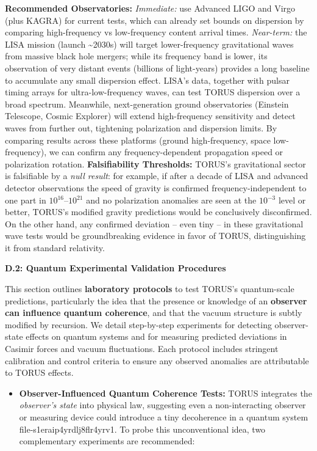 \documentclass[]{article}
\newcommand{\superscript}[1]{\ensuremath{^{\mathrm{#1}}}}
\begin{document}
\textbf{Recommended Observatories:} \emph{Immediate:} use Advanced LIGO
and Virgo (plus KAGRA) for current tests, which can already set bounds
on dispersion by comparing high-frequency vs low-frequency content
arrival times​. \emph{Near-term:} the LISA mission (launch
\textasciitilde{}2030s) will target lower-frequency gravitational waves
from massive black hole mergers; while its frequency band is lower, its
observation of very distant events (billions of light-years) provides a
long baseline to accumulate any small dispersion effect​. LISA's data,
together with pulsar timing arrays for ultra-low-frequency waves, can
test TORUS dispersion over a broad spectrum. Meanwhile, next-generation
ground observatories (Einstein Telescope, Cosmic Explorer) will extend
high-frequency sensitivity and detect waves from further out, tightening
polarization and dispersion limits. By comparing results across these
platforms (ground high-frequency, space low-frequency), we can confirm
any frequency-dependent propagation speed or polarization rotation.
\textbf{Falsifiability Thresholds:} TORUS's gravitational sector is
falsifiable by a \emph{null result}: for example, if after a decade of
LISA and advanced detector observations the speed of gravity is
confirmed frequency-independent to one part in
$10\superscript{16}$--$10\superscript{21}$
and no polarization anomalies are seen at the $10\superscript{−3}$ level or
better, TORUS's modified gravity predictions would be conclusively
disconfirmed​. On the other hand, any confirmed deviation -- even tiny
-- in these gravitational wave tests would be groundbreaking evidence in
favor of TORUS, distinguishing it from standard relativity.

\textbf{D.2: Quantum Experimental Validation Procedures}

This section outlines \textbf{laboratory protocols} to test TORUS's
quantum-scale predictions, particularly the idea that the presence or
knowledge of an \textbf{observer can influence quantum coherence}, and
that the vacuum structure is subtly modified by recursion. We detail
step-by-step experiments for detecting observer-state effects on quantum
systems and for measuring predicted deviations in Casimir forces and
vacuum fluctuations. Each protocol includes stringent calibration and
control criteria to ensure any observed anomalies are attributable to
TORUS effects.

\begin{itemize}
\item
  \textbf{Observer-Influenced Quantum Coherence Tests:} TORUS integrates
  the \emph{observer's state} into physical law, suggesting even a
  non-interacting observer or measuring device could introduce a tiny
  decoherence in a quantum system​file-s1eraip4yrdlj8flr4yrv1. To probe
  this unconventional idea, two complementary experiments are
  recommended:
\end{itemize}
\end{document}
